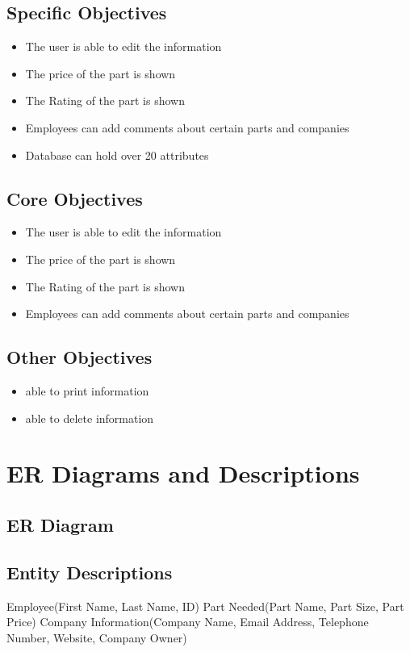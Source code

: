 \subsection{Specific Objectives}
\begin{itemize}
	\item The user is able to edit the information 
	\item The price of the part is shown
	\item The Rating of the part is shown
	\item Employees can add comments about certain parts and companies
	\item Database can hold over 20 attributes
\end{itemize}
\subsection{Core Objectives}
\begin{itemize}
	\item The user is able to edit the information 
	\item The price of the part is shown
	\item The Rating of the part is shown
	\item Employees can add comments about certain parts and companies
\end{itemize}
\subsection{Other Objectives}
\begin{itemize}
	\item able to print information
	\item able to delete information
\end{itemize}
\section{ER Diagrams and Descriptions}

\subsection{ER Diagram}

\subsection{Entity Descriptions}
Employee(First Name, Last Name, ID)
Part Needed(Part Name, Part Size, Part Price)
Company Information(Company Name, Email Address, Telephone Number, Website, Company Owner) 

